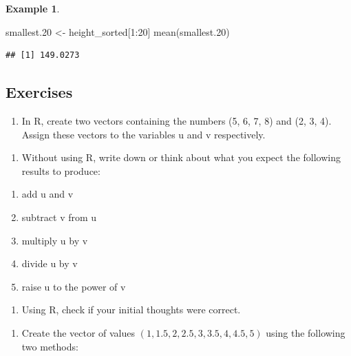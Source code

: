 \documentclass[
]{book}
\newenvironment{Shaded}{\begin{snugshade}}{\end{snugshade}}
\newcommand{\DecValTok}[1]{\textcolor[rgb]{0.00,0.00,0.81}{#1}}
\newcommand{\FloatTok}[1]{\textcolor[rgb]{0.00,0.00,0.81}{#1}}
\newcommand{\FunctionTok}[1]{\textcolor[rgb]{0.00,0.00,0.00}{#1}}
\newcommand{\NormalTok}[1]{#1}
\newcommand{\OtherTok}[1]{\textcolor[rgb]{0.56,0.35,0.01}{#1}}
\newcommand{\SpecialCharTok}[1]{\textcolor[rgb]{0.00,0.00,0.00}{#1}}
\providecommand{\tightlist}{%
  \setlength{\itemsep}{0pt}\setlength{\parskip}{0pt}}
\theoremstyle{definition}
\theoremstyle{definition}
\newtheorem{example}{Example}[chapter]
\theoremstyle{definition}
\theoremstyle{definition}
\theoremstyle{remark}
\begin{document}
\begin{example}
\begin{Shaded}
\begin{Highlighting}[]
\NormalTok{smallest}\FloatTok{.20} \OtherTok{\textless{}{-}}\NormalTok{ height\_sorted[}\DecValTok{1}\SpecialCharTok{:}\DecValTok{20}\NormalTok{]}
\FunctionTok{mean}\NormalTok{(smallest}\FloatTok{.20}\NormalTok{)}
\end{Highlighting}
\end{Shaded}

\begin{verbatim}
## [1] 149.0273
\end{verbatim}

\end{example}

\hypertarget{exercises}{%
\subsection{Exercises}\label{exercises}}

\begin{enumerate}
\def\labelenumi{\arabic{enumi}.}
\tightlist
\item
  In R, create two vectors containing the numbers (5, 6, 7, 8) and (2, 3, 4). Assign these vectors to the variables u and v respectively.
\end{enumerate}

\begin{enumerate}
\def\labelenumi{\roman{enumi}.}
\tightlist
\item
  Without using R, write down or think about what you expect the following results to produce:
\end{enumerate}

\begin{enumerate}
\def\labelenumi{\alph{enumi}.}
\tightlist
\item
  add u and v
\item
  subtract v from u
\item
  multiply u by v
\item
  divide u by v
\item
  raise u to the power of v
\end{enumerate}

\begin{enumerate}
\def\labelenumi{\roman{enumi}.}
\setcounter{enumi}{1}
\tightlist
\item
  Using R, check if your initial thoughts were correct.
\end{enumerate}

\begin{enumerate}
\def\labelenumi{\arabic{enumi}.}
\setcounter{enumi}{1}
\tightlist
\item
  Create the vector of values \((1, 1.5, 2, 2.5, 3, 3.5, 4, 4.5, 5)\) using the following two methods:
\end{enumerate}
\end{document}

